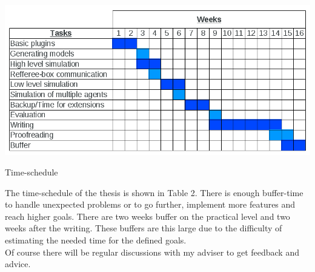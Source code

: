 \documentclass[a4paper,11pt]{article}
\begin{document}
\begin{table}
\centering
\includegraphics[scale=0.43]{pics/Schedule.png}
\label{Table 2}
\caption{Time-schedule}
\end{table}

The time-schedule of the thesis is shown in Table 2. There is enough buffer-time to handle unexpected problems or to go further, implement more features and reach higher goals. There are two weeks buffer on the practical level and two weeks after the writing. These buffers are this large due to the difficulty of estimating the needed time for the defined goals.\\
Of course there will be regular discussions with my adviser to get feedback and advice.
\end{document}
